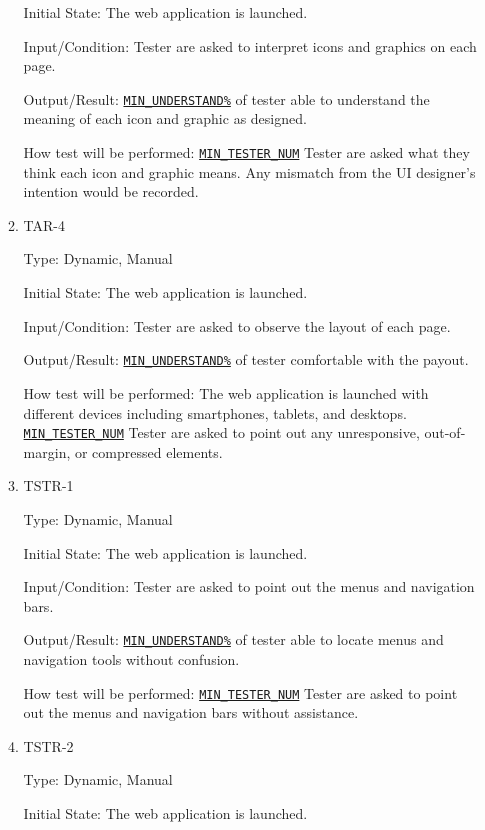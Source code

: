\documentclass[12pt, titlepage]{article}
\begin{document}
\begin{enumerate}
\begin{enumerate}
Initial State: The web application is launched.
					
Input/Condition: Tester are asked to interpret icons and graphics on each page.
					
Output/Result: \hyperref[MIN_UNDERSTAND]{\texttt{MIN\_UNDERSTAND\%}} of tester able to understand the meaning of each icon and graphic as designed.
					
How test will be performed: \hyperref[MIN_TESTER_NUM]{\texttt{MIN\_TESTER\_NUM}} Tester are asked what they think each icon and graphic means. Any mismatch from the UI designer's intention would be recorded.

\item{TAR-4\\}\label{TAR-4}

Type: Dynamic, Manual
					
Initial State: The web application is launched.
					
Input/Condition: Tester are asked to observe the layout of each page.
					
Output/Result: \hyperref[MIN_UNDERSTAND]{\texttt{MIN\_UNDERSTAND\%}} of tester comfortable with the payout.
					
How test will be performed: The web application is launched with different devices including smartphones, tablets, and desktops.  \hyperref[MIN_TESTER_NUM]{\texttt{MIN\_TESTER\_NUM}} Tester are asked to point out any unresponsive, out-of-margin, or compressed elements.

\item{TSTR-1\\}\label{TSTR-1}

Type: Dynamic, Manual
					
Initial State: The web application is launched.
					
Input/Condition: Tester are asked to point out the menus and navigation bars.
					
Output/Result: \hyperref[MIN_UNDERSTAND]{\texttt{MIN\_UNDERSTAND\%}} of tester able to locate menus and navigation tools without confusion.
					
How test will be performed: \hyperref[MIN_TESTER_NUM]{\texttt{MIN\_TESTER\_NUM}} Tester are asked to point out the menus and navigation bars without assistance.

\item{TSTR-2\\}\label{TSTR-2}

Type: Dynamic, Manual
					
Initial State: The web application is launched.
					

\end{enumerate}
\end{enumerate}
\end{document}
